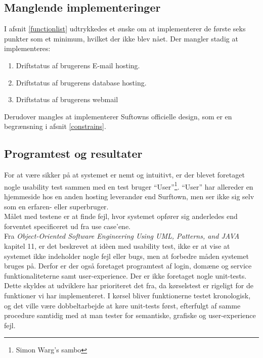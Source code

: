 \documentclass[12pt]{article}
\begin{document}
\subsection*{Manglende implementeringer}
I afsnit \ref{functionlist} udtrykkedes et ønske om at implementerer de første seks punkter som et minimum, hvilket der ikke blev nået. Der mangler stadig at implementeres:
\begin{enumerate}
	\item Driftstatus af brugerens E-mail hosting.
	\item Driftstatus af brugerens database hosting.
	\item Driftstatus af brugerens webmail
\end{enumerate}
Derudover mangles at implementerer Suftowns officielle design, som er en begrænsning i afsnit \ref{constrains}.


\subsection{Programtest og resultater}
For at være sikker på at systemet er nemt og intuitivt, er der blevet foretaget nogle usability test sammen med en test bruger ``User''\footnote{Simon Warg's sambo}. ``User'' har allereder en hjemmeside hos en anden hosting leverandør end Surftown, men ser ikke sig selv som en erfaren- eller superbruger.\\
Målet med testene er at finde fejl, hvor systemet opfører sig anderledes end forventet specificeret ud fra use case'ene.\\
Fra \emph{Object-Oriented Software Engineering Using UML, Patterns, and JAVA}\cite{OOSE} kapitel 11, er det beskrevet at idèen med usability test, ikke er at vise at systemet ikke indeholder nogle fejl eller bugs, men at forbedre måden systemet bruges på. Derfor er der også foretaget programtest af login, domæne og service funktionaliteterne samt user-experience. Der er ikke foretaget nogle unit-tests. Dette skyldes at udviklere har prioriteret det fra, da kørselstest er rigeligt for de funktioner vi har implementeret. I kørsel bliver funktionerne testet kronologisk, og det ville være dobbeltarbejde at køre unit-tests først, efterfulgt af samme procedure samtidig med at man tester for semantiske, grafiske og user-experience fejl.
\end{document}
